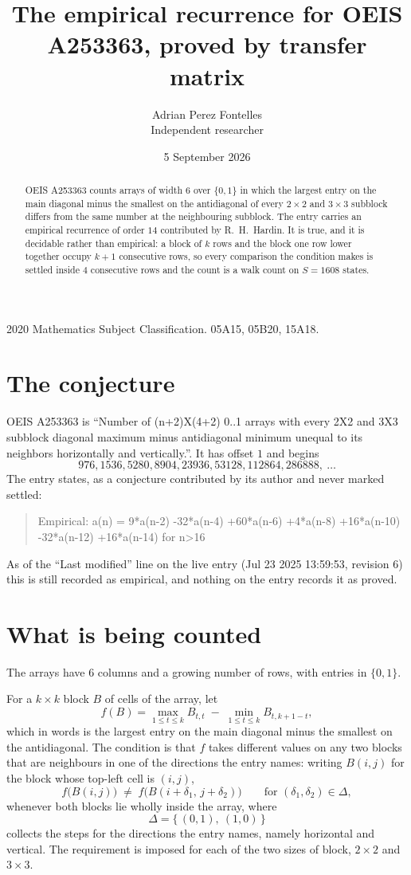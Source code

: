 \documentclass[11pt,a4paper]{article}
\title{The empirical recurrence for OEIS A253363, proved by transfer matrix}
\author{Adrian Perez Fontelles\\ \small Independent researcher}
\date{5 September 2026}
\theoremstyle{plain}
\theoremstyle{definition}
\begin{document}
\maketitle

\begin{abstract}
OEIS A253363 counts arrays of width $6$ over $\{0,1\}$ in which the largest entry on the main diagonal minus the smallest on the antidiagonal of every $2\times2$ and $3\times3$ subblock differs from the same number at the neighbouring subblock. The entry carries an
empirical recurrence of order $14$ contributed by R.~H.~Hardin. It is true, and it is
decidable rather than empirical: a block of $k$ rows and the block one row lower together
occupy $k+1$ consecutive rows, so every comparison the condition makes is settled inside
$4$ consecutive rows and the count is a walk count on $S=1608$ states.
\end{abstract}

\noindent\small 2020 Mathematics Subject Classification. 05A15, 05B20, 15A18.\normalsize

\section{The conjecture}

OEIS A253363 is ``Number of (n+2)X(4+2) 0..1 arrays with every 2X2 and 3X3 subblock diagonal maximum minus antidiagonal minimum unequal to its neighbors horizontally and vertically.''. It has offset $1$ and begins
\[
976, 1536, 5280, 8904, 23936, 53128, 112864, 286888,\ \dots
\]
The entry states, as a conjecture contributed by its author and never marked settled:
\begin{quote}
Empirical: a(n) = 9*a(n-2) -32*a(n-4) +60*a(n-6) +4*a(n-8) +16*a(n-10) -32*a(n-12) +16*a(n-14) for n>16
\end{quote}
As of the ``Last modified'' line on the live entry (Jul 23 2025 13:59:53, revision 6) this is still
recorded as empirical, and nothing on the entry records it as proved.

\section{What is being counted}

The arrays have $6$ columns and a growing number of rows, with entries in $\{0,1\}$.

For a $k\times k$ block $B$ of cells of the array, let
\[
f(B)=\max_{1\le t\le k}B_{t,t}\;-\;\min_{1\le t\le k}B_{t,k+1-t} ,
\]
which in words is the largest entry on the main diagonal minus the smallest on the antidiagonal. The condition is that $f$ takes different values on any two blocks that
are neighbours in one of the directions the entry names: writing $B(i,j)$ for the block whose
top-left cell is $(i,j)$,
\[
f\bigl(B(i,j)\bigr)\;\neq\;f\bigl(B(i+\delta_1,\,j+\delta_2)\bigr)
\qquad\text{for }(\delta_1,\delta_2)\in\Delta,
\]
whenever both blocks lie wholly inside the array, where
\[
\Delta=\{\,(0,1),\ (1,0)\,\}
\]
collects the steps for the directions the entry names, namely horizontal and vertical. The
requirement is imposed for each of the two sizes of block, $2\times2$ and $3\times3$.
\end{document}
